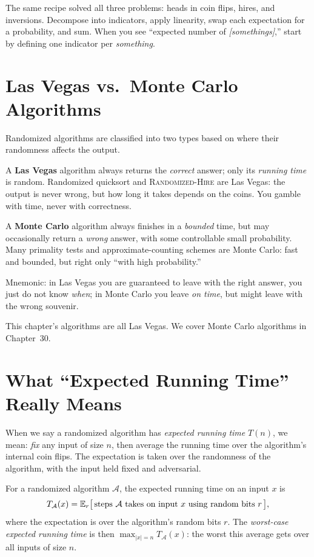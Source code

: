 \begin{focusbox}
The same recipe solved all three problems: heads in coin flips, hires, and inversions. Decompose into indicators, apply linearity, swap each expectation for a probability, and sum. When you see ``expected
number of \emph{[somethings]},'' start by defining one indicator per
\emph{something}.
\end{focusbox}

\section{Las Vegas vs.\ Monte Carlo Algorithms}

Randomized algorithms are classified into two types based on where their randomness affects the output.

\begin{intuitionbox}
A \textbf{Las Vegas} algorithm always returns the \emph{correct} answer; only its
\emph{running time} is random. Randomized quicksort and \textsc{Randomized-Hire}
are Las Vegas: the output is never wrong, but how long it takes depends on the
coins. You gamble with time, never with correctness.

A \textbf{Monte Carlo} algorithm always finishes in a \emph{bounded} time, but
may occasionally return a \emph{wrong} answer, with some controllable small
probability. Many primality tests and approximate-counting schemes are Monte
Carlo: fast and bounded, but right only ``with high probability.''

Mnemonic: in Las Vegas you are guaranteed to leave with the right answer, you
just do not know \emph{when}; in Monte Carlo you leave \emph{on time}, but might
leave with the wrong souvenir.
\end{intuitionbox}

This chapter's algorithms are all Las Vegas. We cover Monte Carlo algorithms in Chapter~30.

\section{What ``Expected Running Time'' Really Means}

When we say a randomized algorithm has \emph{expected running time} $T(n)$, we mean: \emph{fix} any input of size $n$, then average the running time over the algorithm's internal coin flips. The expectation is taken over the randomness of the
algorithm, with the input held fixed and adversarial.

\begin{formalbox}
For a randomized algorithm $\mathcal{A}$, the expected running time on an input
$x$ is
\[
  T_{\mathcal{A}}(x) = \mathbb{E}_{r}\big[\, \text{steps } \mathcal{A} \text{ takes on
  input } x \text{ using random bits } r \,\big],
\]
where the expectation is over the algorithm's random bits $r$. The
\emph{worst-case expected running time} is then $\max_{|x| = n}
T_{\mathcal{A}}(x)$: the worst this average gets over all inputs of size $n$.
\end{formalbox}

